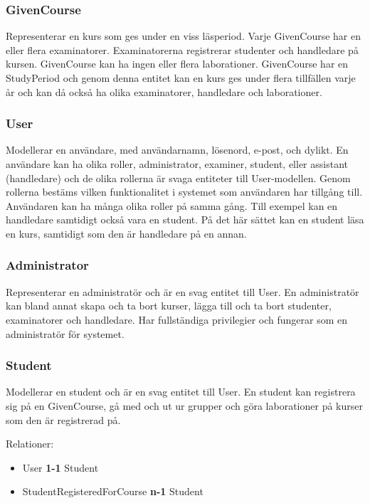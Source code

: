 \subsubsection{GivenCourse}
Representerar en kurs som ges under en viss läsperiod. Varje GivenCourse har en eller flera examinatorer. Examinatorerna registrerar studenter och handledare på kursen. GivenCourse kan ha ingen eller flera laborationer. GivenCourse har en StudyPeriod och genom denna entitet kan en kurs ges under flera tillfällen varje år och kan då också ha olika examinatorer, handledare och laborationer.

\subsubsection{User}
Modellerar en användare, med användarnamn, lösenord, e-post, och dylikt. En användare kan ha olika roller, administrator, examiner, student, eller assistant (handledare) och de olika rollerna är svaga entiteter till User-modellen. Genom rollerna bestäms vilken funktionalitet i systemet som användaren har tillgång till. Användaren kan ha många olika roller på samma gång. Till exempel kan en handledare samtidigt också vara en student. På det här sättet kan en student läsa en kurs, samtidigt som den är handledare på en annan. 

\subsubsection{Administrator}
Representerar en administratör och är en svag entitet till User. En administratör kan bland annat skapa och ta bort kurser, lägga till och ta bort studenter, examinatorer och handledare. Har fullständiga privilegier och fungerar som en administratör för systemet.

\subsubsection{Student}
Modellerar en student och är en svag entitet till User. En student kan registrera sig på en GivenCourse, gå med och ut ur grupper och göra laborationer på kurser som den är registrerad på. 

Relationer: 
\begin{itemize}
  \item User {\bf 1-1} Student 
  \item StudentRegisteredForCourse {\bf n-1} Student 
\end{itemize}

